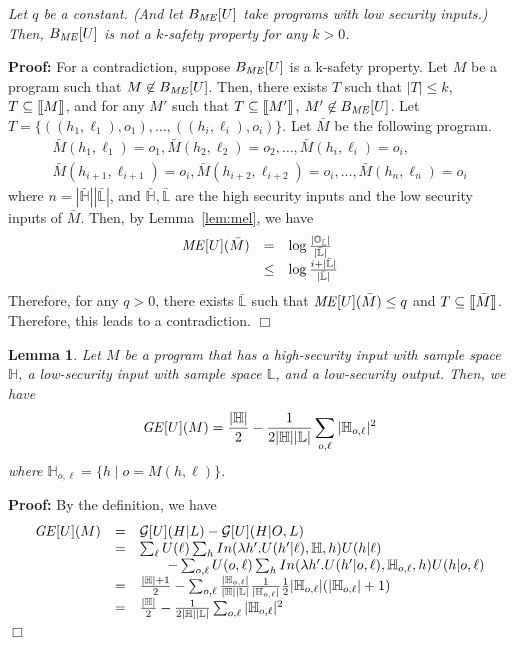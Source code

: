 \documentclass{llncs}
\newtheorem{lemma}[theorem]{Lemma}
\newenvironment{proof}{\noindent\rm{\bf Proof:}}{\hbox{$\Box$}\vspace*{0.2\baselineskip}}
\newenvironment{reftheorem}[1]{\begin{trivlist}\item[\hskip
      \labelsep{\bf Theorem #1.}]\it}{\end{trivlist}}
\newcommand{\aset}[1]{\{{#1}\}}
\newcommand{\sembrack}[1]{[\hspace*{-1.2pt}[#1]\hspace*{-1.2pt}]}
\begin{document}
\begin{reftheorem}{\ref{thm:menk}}
  Let $q$ be a constant.  (And let $B_{\it ME}[U]$ take programs with
  low security inputs.) Then, $B_{\it ME}[U]$ is not a $k$-safety
  property for any $k > 0$.
\end{reftheorem}
\begin{proof}
  For a contradiction, suppose $B_{\it ME}[U]$ is a k-safety property.
  Let $M$ be a program such that $M\not\in B_{\it ME}[U]$.  Then,
  there exists $T$ such that $|T|\le k$, $T\subseteq\sembrack{M}$, and
  for any $M'$ such that $T\subseteq \sembrack{M'}$, $M'\not\in
  B_{\it ME}[U]$.  Let
  $T=\aset{((h_1,\ell_1),o_1),\dots,((h_i,\ell_i),o_i)}$.  Let
  $\bar{M}$ be the following program.
\[
\begin{array}{l}
  \bar{M}(h_1,\ell_1)=o_1, \bar{M}(h_2,\ell_2)=o_2, \dots, \bar{M}(h_i,\ell_i)=o_i,\\
  \bar{M}(h_{i+1},\ell_{i+1})=o_i, \bar{M}(h_{i+2},\ell_{i+2})=o_i, \dots, \bar{M}(h_{n},\ell_n)=o_i
\end{array}
\]
where $n=|\mathbb{\bar{H}}||\mathbb{\bar{L}}|$, and $\mathbb{\bar{H}},
\mathbb{\bar{L}}$ are the high security inputs and the low security
inputs of $\bar{M}$.  Then, by Lemma~\ref{lem:mel}, we have
\[
\begin{array}{rcl}
{\it ME}[U](\bar{M})&=&\log\frac{|\mathbb{O}_\mathbb{\bar{L}}|}{|\mathbb{\bar{L}}|}\\
&\le& \log \frac{i+|\mathbb{{\bar{L}}}|}{|\mathbb{\bar{L}}|}
\end{array}
\]
Therefore, for any $q > 0$, there exists $\mathbb{\bar{L}}$ such that
${\it ME}[U](\bar{M}) \leq q$ and $T\subseteq\sembrack{\bar{M}}$.
Therefore, this leads to a contradiction.
\end{proof}

\begin{lemma}
\label{lem:geu2}
Let $M$ be a program that has a high-security input with sample space
$\mathbb{H}$, a low-security input with sample space $\mathbb{L}$, and
a low-security output.  Then, we have
\[
{\it
    GE}[U](M)=\frac{|\mathbb{H}|}{2}-\frac{1}{2|\mathbb{H}||\mathbb{L}|}\sum_{o,\ell}
  |\mathbb{H}_{o,\ell}|^2
\] 
where $\mathbb{H}_{o,\ell}=\aset{h\mid o=M(h,\ell)}$.
\end{lemma}
\begin{proof}
By the definition, we have
\[
\begin{array}{rcl}
{\it GE}[U](M)&=&\mathcal{G}[U](H|L)-\mathcal{G}[U](H|O,L)\\
&=&\sum_\ell U(\ell)\sum_h In(\lambda h'.U(h'|\ell),\mathbb{H},h)U(h|\ell)\\
&&\qquad-\sum_{o,\ell} U(o,\ell)\sum_h In(\lambda h'.U(h'|o,\ell),\mathbb{H}_{o,\ell},h) U(h|o,\ell)\\
&=&\frac{|\mathbb{H}|+1}{2}-\sum_{o,\ell} \frac{|\mathbb{H}_{o,\ell}|}{|\mathbb{H}||\mathbb{L}|}\frac{1}{|\mathbb{H}_{o,\ell}|}\frac{1}{2}|\mathbb{H}_{o,\ell}|(|\mathbb{H}_{o,\ell}|+1)\\
&=&\frac{|\mathbb{H}|}{2}-\frac{1}{2|\mathbb{H}||\mathbb{L}|}\sum_{o,\ell} |\mathbb{H}_{o,\ell}|^2 
\end{array}
\]
\end{proof}
\end{document}
